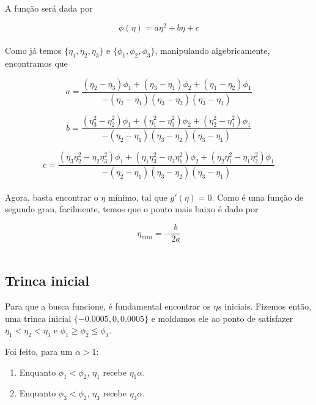 \documentclass[12pt]{article}
\begin{document}
A função será dada por

\begin{equation}
	\phi(\eta) = a\eta^2 + b\eta + c
\end{equation} \\

Como já temos $\{\eta_1, \eta_2,\eta_3\}$ e $\{\phi_1, \phi_2, \phi_3\}$, manipulando algebricamente, encontramos que

\begin{equation}
a = \frac{(\eta_2 - \eta_3)\phi_1 + (\eta_3 - \eta_1)\phi_2 + (\eta_1 - \eta_2)\phi_1}{-(\eta_2 - \eta_1)(\eta_3 - \eta_2)(\eta_3 - \eta_1)} 
\end{equation}

\begin{equation}
b = \frac{(\eta_3^2 - \eta_2^2)\phi_1 + (\eta_1^2 - \eta_3^2)\phi_2 + (\eta_2^2 - \eta_1^2)\phi_1}{-(\eta_2 - \eta_1)(\eta_3 - \eta_2)(\eta_3 - \eta_1)} 
\end{equation}

\begin{equation}
c = \frac{(\eta_3\eta_2^2 - \eta_2\eta_3^2)\phi_1 + (\eta_1\eta_3^2 - \eta_3\eta_1^2)\phi_2 + (\eta_2\eta_1^2 - \eta_1\eta_2^2)\phi_1}{- (\eta_2 - \eta_1)(\eta_3 - \eta_2)(\eta_3 - \eta_1)} 
\end{equation} \\

Agora, basta encontrar o $\eta$ mínimo, tal que $g'(\eta) = 0$. Como é uma função de segundo grau, facilmente, temos que o ponto mais baixo é dado por

\begin{equation} \label{eq:eta_minimo}
\eta_{min} = -\frac{b} {2 a}
\end{equation} \\

\subsection{Trinca inicial}
\mbox{}

Para que a busca funcione, é fundamental encontrar os $\eta s$ iniciais. Fizemos então, uma trinca inicial $\{-0.0005, 0, 0.0005\}$ e moldamos ele ao ponto de satisfazer $\eta_1 < \eta_2 < \eta_3$ e $\phi_1 \geq \phi_2 \leq \phi_3$.

Foi feito, para um $\alpha > 1$:

\begin{enumerate}
	\item Enquanto $\phi_1 < \phi_2$, $\eta_1$ recebe $\eta_1\alpha$.
	\item Enquanto $\phi_3 < \phi_2$, $\eta_3$ recebe $\eta_3\alpha$.
\end{enumerate}
\end{document}
